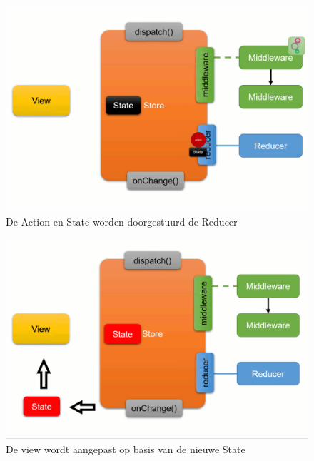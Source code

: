 \begin{figure}[H]
    \centering
    \includegraphics[width=\figureWidthModifier\linewidth]{img/stand-van-zaken/redux-working-detailed-3.png}
    \caption{De Action en State worden doorgestuurd de Reducer}
    \label{fig:redux-working-detailed-3}
\end{figure}

\begin{figure}[H]
    \centering
    \includegraphics[width=\figureWidthModifier\linewidth]{img/stand-van-zaken/redux-working-detailed-4.png}
    \caption{De view wordt aangepast op basis van de nieuwe State}
    \label{fig:redux-working-detailed-4}
\end{figure}

